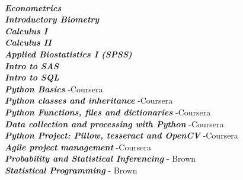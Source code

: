\documentclass[9pt]{adeckcv} %
\begin{document}

\begin{minipage}[t]{0.5\textwidth}
	\vspace{-\baselineskip}
	\\
	\textbf{\large{\textit{Econometrics}}} \\
  \textbf{\large{\textit{Introductory Biometry}}} \\
  \textbf{\large{\textit{Calculus I}}} \\
  \textbf{\large{\textit{Calculus II}}} \\
  \textbf{\large{\textit{Applied Biostatistics I (SPSS)}}} \\
  \textbf{\large{\textit{Intro to SAS}}} \\
  \textbf{\large{\textit{Intro to SQL}}} \\
  \textbf{\large{\textit{Python Basics}}} -Coursera \\
  \textbf{\large{\textit{Python classes and inheritance}}} -Coursera \\
  \textbf{\large{\textit{Python Functions, files and dictionaries}}} -Coursera \\
  \textbf{\large{\textit{Data collection and processing with Python}}} -Coursera \\
  \textbf{\large{\textit{Python Project: Pillow, tesseract and OpenCV}}} -Coursera \\
  \textbf{\large{\textit{Agile project management}}} -Coursera \\
  \textbf{\large{\textit{Probability and Statistical Inferencing}}} - Brown \\
  \textbf{\large{\textit{Statistical Programming}}} - Brown \\
\end{minipage}
\hfill
\end{document}
